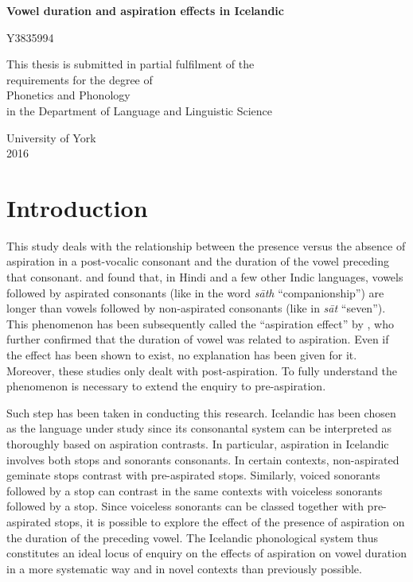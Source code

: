 \documentclass[11pt,a4paper,oneside,openany]{memoir}\usepackage[]{graphicx}\usepackage[]{color}
\newcommand{\titlePage}{
\thispagestyle{empty}%
\vspace{1in}%
\begin{center}
{\Huge \textbf{Vowel duration and aspiration effects in Icelandic}}
\end{center}
\vspace{0.75in}
\begin{center}
{\huge Y3835994} \\
\vspace{1in}

\begin{center}
\begin{minipage}{5in}
\begin{center}
This thesis is submitted in partial fulfilment of the\\
requirements for the degree of\\
Phonetics and Phonology \\
in the Department of Language and Linguistic Science
\end{center}
\end{minipage}
\end{center}

\vfill
University of York \\
\vspace{0.5in}
\vspace{0.25in}
2016
\end{center}
}
\begin{document}
\begin{titlingpage}
\titlePage
\end{titlingpage}





\frontmatter

\setcounter{page}{2}



\tableofcontents*
\newpage
\listoftables*
\newpage
\listoffigures*




\mainmatter
\setcounter{page}{9}


\chapter{Introduction}
\label{c:introduction}

This study deals with the relationship between the presence versus the absence of aspiration in a post-vocalic consonant and the duration of the vowel preceding that consonant.
\citet{maddieson1976} and \citet{maddieson1976a} found that, in Hindi and a few other Indic languages, vowels followed by aspirated consonants (like in the word \textit{sāth} ``companionship'') are longer than vowels followed by non-aspirated consonants (like in \textit{sāt} ``seven'').
This phenomenon has been subsequently called the ``aspiration effect'' by \citet{durvasula2012}, who further confirmed that the duration of vowel was related to aspiration.
Even if the effect has been shown to exist, no explanation has been given for it.
Moreover, these studies only dealt with post-aspiration.
To fully understand the phenomenon is necessary to extend the enquiry to pre-aspiration.

Such step has been taken in conducting this research.
Icelandic has been chosen as the language under study since its consonantal system can be interpreted as thoroughly based on aspiration contrasts.
In particular, aspiration in Icelandic involves both stops and sonorants consonants.
In certain contexts, non-aspirated geminate stops contrast with pre-aspirated stops.
Similarly, voiced sonorants followed by a stop can contrast in the same contexts with voiceless sonorants followed by a stop.
Since voiceless sonorants can be classed together with pre-aspirated stops, it is possible to explore the effect of the presence of aspiration on the duration of the preceding vowel.
The Icelandic phonological system thus constitutes an ideal locus of enquiry on the effects of aspiration on vowel duration in a more systematic way and in novel contexts than previously possible.
\end{document}
